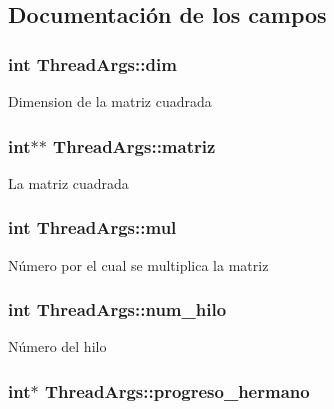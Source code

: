 \subsection{Documentación de los campos}
\hypertarget{structThreadArgs_aa8b404d63d12ecf9fe2e7931a6e3402a}{
\subsubsection[{dim}]{\setlength{\rightskip}{0pt plus 5cm}int Thread\-Args\-::dim}}\label{structThreadArgs_aa8b404d63d12ecf9fe2e7931a6e3402a}
Dimension de la matriz cuadrada \hypertarget{structThreadArgs_af325a287ef529e08ac2f1cb0f223b696}{
\subsubsection[{matriz}]{\setlength{\rightskip}{0pt plus 5cm}int$\ast$$\ast$ Thread\-Args\-::matriz}}\label{structThreadArgs_af325a287ef529e08ac2f1cb0f223b696}
La matriz cuadrada \hypertarget{structThreadArgs_a1bf04327201dd153e50895ea1b8e9ca0}{
\subsubsection[{mul}]{\setlength{\rightskip}{0pt plus 5cm}int Thread\-Args\-::mul}}\label{structThreadArgs_a1bf04327201dd153e50895ea1b8e9ca0}
Número por el cual se multiplica la matriz \hypertarget{structThreadArgs_a63a99447b50d466b77759dbe635af785}{
\subsubsection[{num\-\_\-hilo}]{\setlength{\rightskip}{0pt plus 5cm}int Thread\-Args\-::num\-\_\-hilo}}\label{structThreadArgs_a63a99447b50d466b77759dbe635af785}
Número del hilo \hypertarget{structThreadArgs_adb9645ac234d5278d06c1450af517fad}{
\subsubsection[{progreso\-\_\-hermano}]{\setlength{\rightskip}{0pt plus 5cm}int$\ast$ Thread\-Args\-::progreso\-\_\-hermano}}\label{structThreadArgs_adb9645ac234d5278d06c1450af517fad}
